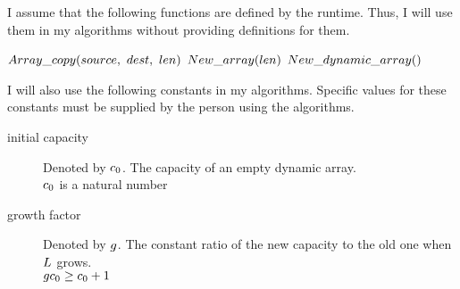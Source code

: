 I assume that the following functions are defined by the runtime. Thus, I will use them in my algorithms without providing definitions for them.

\begin{algorithm}[H]
	\begin{algorithmic}
		\State $\FuncArrayCopy(source,\ dest,\ len)$
		\State
		\State $New\_array(len)$
		\State
		\State $New\_dynamic\_array()$
	\end{algorithmic}
\end{algorithm}

I will also use the following constants in my algorithms. Specific values for these constants must be supplied by the person using the algorithms.

\begin{description}
	\item[initial capacity] Denoted by $c_0$. The capacity of an empty dynamic array.\\
	{\HdrAssumptions} $c_0$ is a natural number
	\item[growth factor] Denoted by $g$. The constant ratio of the new capacity to the old one when $L$ grows.\\
	{\HdrAssumptions} $gc_0 \geq c_0 + 1$
\end{description}